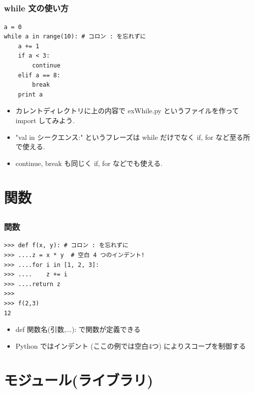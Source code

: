 \subsection*{\redm\whitem\greenb}
\begin{frame}[t,fragile]
\frametitle{while 文の使い方}
\begin{lstlisting}
a = 0
while a in range(10): # コロン : を忘れずに
    a += 1
    if a < 3:
        continue
    elif a == 8:
        break
    print a

\end{lstlisting}

\begin{itemize}
\item カレントディレクトリに上の内容で exWhile.py というファイルを作って import してみよう.
\item "val in シークエンス:" というフレーズは while だけでなく if, for など至る所で使える.
\item continue, break も同じく if, for などでも使える.
\end{itemize}
\end{frame}

\section{関数}

\subsection*{\redm\whiteb\greenb}
\begin{frame}[t,fragile]
\frametitle{関数}
\begin{lstlisting}
>>> def f(x, y): # コロン : を忘れずに
>>> ....z = x * y  # 空白 4 つのインデント!
>>> ....for i in [1, 2, 3]:
>>> ....    z += i
>>> ....return z
>>>
>>> f(2,3)
12
\end{lstlisting}
\begin{itemize}
\item def 関数名(引数,...): で関数が定義できる
\item Python ではインデント (ここの例では空白4つ) によりスコープを制御する
\end{itemize}
\end{frame}

\section{モジュール(ライブラリ)}

